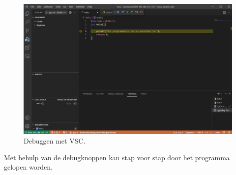 \begin{enumerate}
\begin{figure}[h!]
\captionsetup{justification=centering}
\includegraphics[width=0.8 \linewidth]{figuren/VSCdebugVeld}
\centering
\caption{Debuggen met VSC.}
\label{fig:vscDebugVld}
\end{figure}     
   Met behulp van de debugknoppen  kan stap voor stap door het programma gelopen worden.
     \end{enumerate}
     
	
